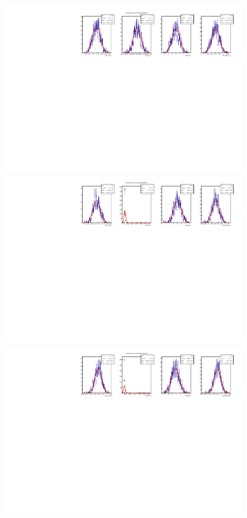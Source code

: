 \begin{figure}[t]
  \begin{center}
    \includegraphics[width=0.8\textwidth]{AA-Appdx-mcbootstrap/figs/1DPullPlot_p_0_RLogisticCalibration_MCTruth_Bu2D0Pi_OS_20171114_SSbarAccAsymmFTFloatDMGammaConstrAllSamples.pdf} \\
    \includegraphics[width=0.8\textwidth]{AA-Appdx-mcbootstrap/figs/1DPullPlot_p_1_RLogisticCalibration_MCTruth_Bu2D0Pi_OS_20171114_SSbarAccAsymmFTFloatDMGammaConstrAllSamples.pdf} \\
    \includegraphics[width=0.8\textwidth]{AA-Appdx-mcbootstrap/figs/1DPullPlot_p_2_RLogisticCalibration_MCTruth_Bu2D0Pi_OS_20171114_SSbarAccAsymmFTFloatDMGammaConstrAllSamples.pdf} \\

\end{center}
\end{figure}
